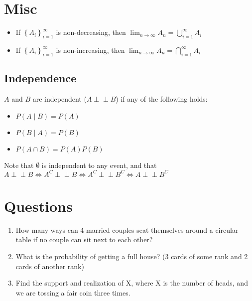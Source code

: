 \documentclass[12pt]{article}
\newcommand{\bb}[1]{\left\{#1\right\}}
\let\oldperp\perp
\renewcommand{\perp}[0]{\oldperp\!\!\!\oldperp}
\begin{document}

\section{Misc}

\begin{itemize}
	\item If $\bb{A_i}_{i = 1}^\infty$ is non-decreasing, then $\lim_{n \rightarrow \infty} A_n = \bigcup_{i = 1}^\infty A_i$
	\item If $\bb{A_i}_{i = 1}^\infty$ is non-increasing, then $\lim_{n \rightarrow \infty} A_n = \bigcap_{i = 1}^\infty A_i$
\end{itemize}

\subsection{Independence}

$A$ and $B$ are independent ($A \perp B$) if any of the following holds:

\begin{itemize}
	\item $P(A \mid B) = P(A)$ 
	\item $P(B \mid A) = P(B)$
	\item $P(A \cap B) = P(A)P(B)$
\end{itemize}

Note that $\emptyset$ is independent to any event, and that \\
$A \perp B \Leftrightarrow A^C \perp B \Leftrightarrow A^C \perp B^C \Leftrightarrow A \perp B^C$

\newpage
\section{Questions}
\begin{enumerate}
	\item How many ways can 4 married couples seat themselves around a circular table if no couple can sit next to each other?
	\item What is the probability of getting a full house? (3 cards of some rank and 2 cards of another rank)
	\item Find the support and realization of X, where X is the number of heads, and we are tossing a fair coin three times.
\end{enumerate}

\newpage 
\end{document}
